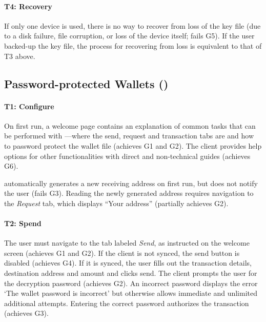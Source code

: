 \paragraph{T4: Recovery} If only one device is used, there is no way to recover from loss of the key file (\eg due to a disk failure, file corruption, or loss of the device itself; fails G5). If the user backed-up the key file, the process for recovering from loss is equivalent to that of T3 above. 


\subsection{Password-protected Wallets (\multibit)}
\paragraph{T1: Configure} On first run, a welcome page contains an explanation of common tasks that can be performed with \multibit---where the send, request and transaction tabs are and how to password protect the wallet file (achieves G1 and G2). The client provides help options for other functionalities with direct and non-technical guides (achieves G6). 

\multibit automatically generates a new receiving address on first run, but does not notify the user (fails G3). Reading the newly generated address requires navigation to the \emph{Request} tab, which displays ``Your address'' (partially achieves G2).

\paragraph{T2: Spend} The user must navigate to the tab labeled \emph{Send}, as instructed on the welcome screen (achieves G1 and G2). If the client is not synced, the send button is disabled (achieves G4). If it is synced, the user fills out the transaction details, destination address and amount and clicks send. The client prompts the user for the decryption password (achieves G2). An incorrect password displays the error `The wallet password is incorrect' but otherwise allows immediate and unlimited additional attempts. Entering the correct password authorizes the transaction (achieves G3).



